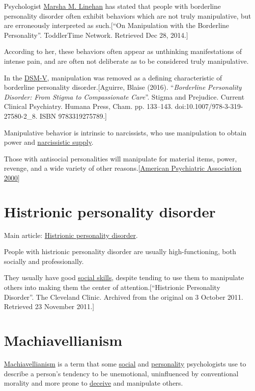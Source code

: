 \documentclass{book}
\numberwithin{equation}{section}
\begin{document}
%
Psychologist \href{https://en.wikipedia.org/wiki/Marsha_M._Linehan}{Marsha M. Linehan} has stated that people with borderline personality disorder often exhibit behaviors which are not truly manipulative, but are erroneously interpreted as such.[``On Manipulation with the Borderline Personality''. ToddlerTime Network. Retrieved Dec 28, 2014.]

According to her, these behaviors often appear as unthinking manifestations of intense pain, and are often not deliberate as to be considered truly manipulative.

In the \href{https://en.wikipedia.org/wiki/DSM-V}{DSM-V}, manipulation was removed as a defining characteristic of borderline personality disorder.[Aguirre, Blaise (2016). ``\textit{Borderline Personality Disorder: From Stigma to Compassionate Care}''. Stigma and Prejudice. Current Clinical Psychiatry. Humana Press, Cham. pp. 133--143. doi:10.1007/978-3-319-27580-2\_8. ISBN 9783319275789.]

%
Manipulative behavior is intrinsic to narcissists, who use manipulation to obtain power and \href{https://en.wikipedia.org/wiki/Narcissistic_supply}{narcissistic supply}.

Those with antisocial personalities will manipulate for material items, power, revenge, and a wide variety of other reasons.[\href{https://en.wikipedia.org/wiki/Psychological_manipulation#CITEREFAmerican_Psychiatric_Association2000}{American Psychiatric Association 2000}]

\section{Histrionic personality disorder}
Main article: \href{https://en.wikipedia.org/wiki/Histrionic_personality_disorder}{Histrionic personality disorder}.

%
People with histrionic personality disorder are usually high-functioning, both socially and professionally.

They usually have good \href{https://en.wikipedia.org/wiki/Social_skills}{social skills}, despite tending to use them to manipulate others into making them the center of attention.[``Histrionic Personality Disorder''. The Cleveland Clinic. Archived from the original on 3 October 2011. Retrieved 23 November 2011.]

\section{Machiavellianism}
\href{https://en.wikipedia.org/wiki/Machiavellianism_(psychology)}{Machiavellianism} is a term that some \href{https://en.wikipedia.org/wiki/Social_psychology}{social} and \href{https://en.wikipedia.org/wiki/Personality_psychology}{personality} psychologists use to describe a person's tendency to be unemotional, uninfluenced by conventional morality and more prone to \href{https://en.wikipedia.org/wiki/Deceive}{deceive} and manipulate others.
\end{document}
